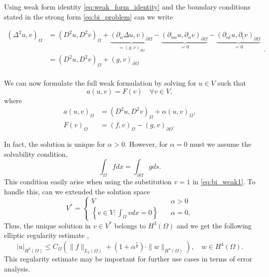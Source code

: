 Using weak form identity \eqref{eq:weak_form_identity} and the boundary conditions stated in the strong form \eqref{eq:bi_problem} can we write

\begin{equation}
\begin{split}
\left( \Delta ^2 u, v \right) _{ \Omega } & = \left( D^2u, D^2v \right) _{\Omega} +   \underbrace{\left( \partial _{n} \Delta u, v  \right) _{\partial \Omega }}_{ = \left( g,v \right) _{\partial \Omega }}   - \underbrace{(\partial _{nn} u, \partial
    _{n} v )_{\partial \Omega }}_{ = 0}  - \underbrace{\left( \partial _{nt} u, \partial _{t}v \right) _{\partial \Omega }}_{ = 0} \\
    &= \left( D^2u, D^2v \right) _{\Omega } + \left( g,v \right) _{\partial \Omega }  \\
\end{split}
.\end{equation}

We can now formulate the full weak formulation by solving for $u \in  V$ such that
\begin{equation}
    \label{eq:bi_weak1}
a\left( u,v \right) = F(v)\quad \forall v \in
V,
\end{equation}
where
\begin{equation}
\label{eq:weak_formulation}
\begin{split}
a\left( u,v \right)_{\Omega } & =    \left( D ^2 u , D ^2 v\right)_{\Omega }  +
\alpha \left( u, v \right)_{\Omega }   , \\
F\left( v \right)_{\Omega } & = \left( f,v \right)_{\Omega } - \left(g,v \right)_{\partial \Omega }.
\end{split}
\end{equation}

 In fact, the solution is unique for $\alpha  > 0$. However, for $\alpha  = 0$ must we assume the solvability condition,
\begin{equation*}
 \int_{\Omega }^{} f dx = \int_{\partial \Omega }^{} g ds
.\end{equation*}
This condition easily arise when using the substitution $v=1$ in \eqref{eq:bi_weak1}. To handle this, can we extended the solution space \[
V^{*} = \begin{cases}
    V \quad & \alpha  > 0 \\
    \left\{ v \in V: \int_{\Omega }^{} v dx  = 0\right\} \quad & \alpha  = 0,
\end{cases}
\]
Thus, the unique solution in $v \in V^{*}$ belongs to $H^{3 }\left( \Omega  \right) $ and we get the following
elliptic regularity estimate \cite{gu2012c0},
\begin{equation}
\label{eq:bi_harmonic_ellitpic_regularity}
\left| u \right| _{H^{3 }\left( \Omega  \right) }  \le C_{\Omega } \left( \| f \|_{  L_{2}( \Omega ) }^{  } + ( 1 + \alpha  ^{\frac{1}{2}}
) \cdot \| w  \|_{ H^{4}\left( \Omega  \right)  }^{  }    \right), \quad w\in H^{4}\left( \Omega  \right).
\end{equation}
This regularity estimate may be important for further use cases in terms of error analysis.

